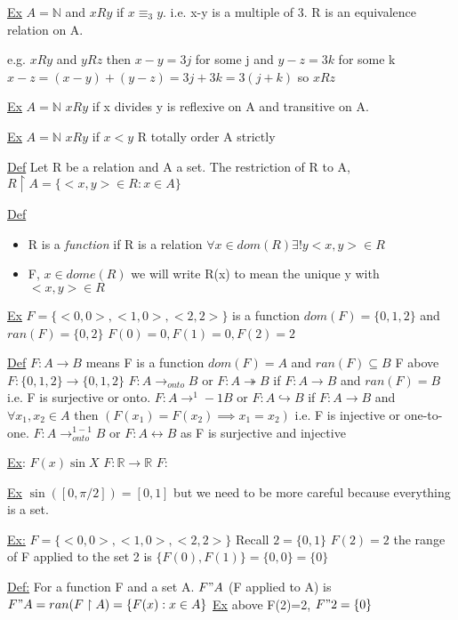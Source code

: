 \documentclass{article}
\begin{document}
    \underline{Ex} $A = \mathbb{N}$ and  $x R y$ if $x \equiv_3 y$. i.e. x-y is a multiple of 3. R is an equivalence relation on A.

    e.g. $x R y$ and $y R z$ then $x-y =3j$ for  some j and $y-z = 3k$ for some k
    $x-z=(x-y) + (y-z) = 3j + 3k = 3(j+k)$ so $x R z$

    \underline{Ex} $A = \mathbb{N}$  $x R y$ if x divides y is reflexive on A and transitive on A.

    \underline{Ex} $A = \mathbb{N}$ $x R y$ if $x < y$ R totally order A strictly

    \underline{Def} Let R be a relation and A a set. The restriction of R to A, $R \upharpoonright A = \{<x,y> \in R : x \in A \}$


    \underline{Def}
    \begin{itemize}
        \item R is a \emph{function} if R is a relation $\forall x \in dom(R) \exists! y <x,y> \in R$
        \item F, $x \in dome(R)$ we will write R(x) to mean the unique y with $<x,y> \in R$
    \end{itemize}

    \underline{Ex} $F = \{<0,0> ,<1,0>,<2,2>\}$ is a function $dom(F) = \{0,1,2\}$ and $ran(F) = \{0,2\}$ $F(0) = 0, F(1) = 0, F(2) = 2$

    \underline{Def} $F : A \rightarrow B$ means F is a function $dom(F) = A$ and $ran(F) \subseteq B$
    F above $F: \{0,1,2\} \rightarrow \{0,1,2\}$
    $F : A \rightarrow_{onto} B$ or $F: A \twoheadrightarrow B$
    if $F: A \rightarrow B$ and $ran(F) = B$ i.e. F is surjective or onto.
    $F: A \rightarrow^1-1 B$ or $F : A \hookrightarrow B$ if $F: A \rightarrow B$ and $\forall x_1, x_2 \in A$ then $(F(x_1) = F(x_2) \implies x_1=x_2)$ i.e. F is injective or one-to-one.
    $F: A \rightarrow^{1-1}_{onto} B$ or $F : A \leftrightarrow B$ as F is surjective and injective

    \underline{Ex}: $F(x) \sin X$
    $F : \mathbb{R} \rightarrow \mathbb{R}$
    $F : $

    \underline{Ex} $\sin([0,\pi / 2]) = [0,1]$ but we need to be more careful because everything is a set.

    \underline{Ex:} $F=\{<0,0>,<1,0>,<2,2>\}$ Recall $2 = \{0,1\}$
    $F(2)=2$
    the range of F applied to the set 2 is $\{F(0), F(1)\}=\{0,0\}=\{0\}$

    \underline{Def:} For a function F and a set A. $F" A$ (F applied to A) is $F" A = ran(F\upharpoonright A)=\{F(x) : x \in A \}$
    \underline{Ex} above F(2)=2, $F"2=\{0\}$
\end{document}
